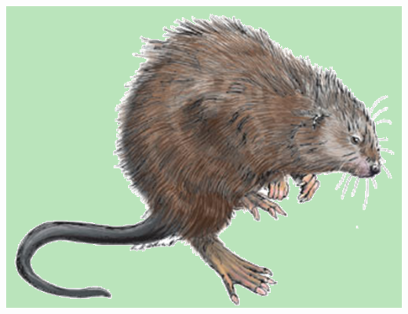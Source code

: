 \documentclass[serif]{beamer}\usepackage[]{graphicx}\usepackage[]{color}
\begin{document}
\begin{frame}[fragile]{\includegraphics[width=0.05\paperwidth]{fig/muskrat.png}\hspace{0.07in}{\bf SWMPrats.net: Widgets}}
\begin{columns}
\begin{column}{0.3\textwidth}
\end{column}
\begin{column}{0.3\textwidth}
\centerline{}
\end{column}
\begin{column}{0.3\textwidth}
\centerline{}
\end{column}
\end{columns}
\end{frame}
\end{document}
